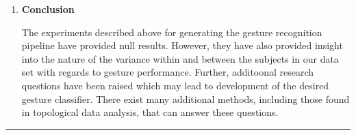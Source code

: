 \documentclass[11pt]{article}
\begin{document}
\begin{enumerate}
\item \textbf{Conclusion}

The experiments described above for generating the gesture recognition pipeline have provided null results. However, they have also provided insight into the nature of the variance within and between the subjects in our data set with regards to gesture performance. Further, additoonal research questions have been raised which may lead to development of the desired gesture classifier. There exist many additional methods, including those found in topological data analysis, that can answer these questions.


\end{enumerate}

\begin{center}
\noindent\rule{16cm}{0.4pt}
\end{center}

\newpage
\end{document}
